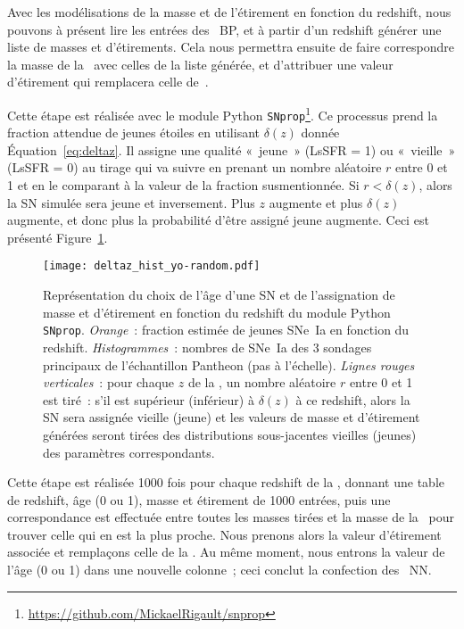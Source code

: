 \documentclass[../main/main.tex]{subfiles}
\begin{document}
Avec les modélisations de la masse et de l'étirement en fonction du redshift,
nous pouvons à présent lire les entrées des \hostlib\ BP, et à partir d'un
redshift générer une liste de masses et d'étirements. Cela nous permettra
ensuite de faire correspondre la masse de la \hostlib\ avec celles de la liste
générée, et d'attribuer une valeur d'étirement qui remplacera celle
de~.

Cette étape est réalisée avec le module Python
\texttt{SNprop}\footnote{\label{fn:snprop}\href{
    https://github.com/MickaelRigault/snprop}
{https://github.com/MickaelRigault/snprop}}. Ce processus prend la fraction
attendue de jeunes étoiles en utilisant $\delta(z)$ donnée
Équation~\ref{eq:deltaz}. Il assigne une qualité «~jeune~» (LsSFR = 1) ou
«~vieille~» (LsSFR = 0) au tirage qui va suivre en prenant un nombre aléatoire
$r$ entre 0 et 1 et en le comparant à la valeur de la fraction susmentionnée. Si
$r < \delta(z)$, alors la SN simulée sera jeune et inversement. Plus $z$
augmente et plus $\delta(z)$ augmente, et donc plus la probabilité d'être
assigné jeune augmente. Ceci est présenté Figure~\ref{fig:deltaz}.

\begin{figure}[]
    \centering
    \texttt{[image: deltaz\_hist\_yo-random.pdf]}
    \caption[Représentation du choix de l'âge d'une SN et de l'assignation de
    masse et d'étirement en fonction du redshift]{Représentation du choix de
        l'âge d'une SN et de l'assignation de masse et d'étirement en fonction
        du redshift du module Python \texttt{SNprop}.
        \textit{Orange}~: fraction estimée de jeunes SNe~Ia en fonction du
        redshift. \textit{Histogrammes}~: nombres de SNe~Ia des 3 sondages
        principaux de l'échantillon Pantheon \citep{scolnic2018} (pas à
        l'échelle). \textit{Lignes rouges verticales}~: pour chaque $z$ de la
        \hostlib, un nombre aléatoire $r$ entre 0 et 1 est tiré~: s'il est
        supérieur (inférieur) à $\delta(z)$ à ce redshift, alors la SN sera
        assignée vieille (jeune) et les valeurs de masse et d'étirement générées
        seront tirées des distributions sous-jacentes vieilles (jeunes) des
    paramètres correspondants.}
    \label{fig:deltaz}
\end{figure}

Cette étape est réalisée \num{1000} fois pour chaque redshift de la \hostlib,
donnant une table de redshift, âge (0 ou 1), masse et étirement de \num{1000}
entrées, puis une correspondance est effectuée entre toutes les masses tirées et
la masse de la \hostlib\ pour trouver celle qui en est la plus proche. Nous
prenons alors la valeur d'étirement associée et remplaçons celle de la \hostlib.
Au même moment, nous entrons la valeur de l'âge (0 ou 1) dans une nouvelle
colonne~; ceci conclut la confection des \hostlib\ NN.
\end{document}
